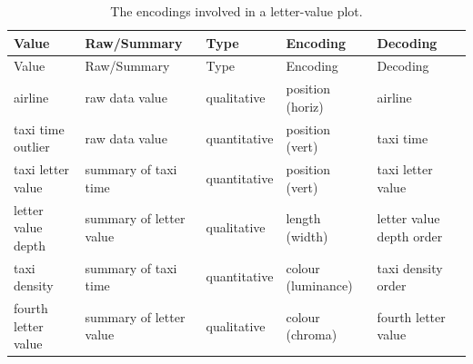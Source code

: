 \documentclass[
  letterpaper,
  DIV=11,
  numbers=noendperiod]{scrreprt}
\begin{document}
\begin{longtable}[]{@{}
  >{\raggedright\arraybackslash}p{}
  >{\raggedright\arraybackslash}p{}
  >{\raggedright\arraybackslash}p{}
  >{\raggedright\arraybackslash}p{}
  >{\raggedright\arraybackslash}p{}@{}}
\caption{The encodings involved in a letter-value
plot.}\label{tbl-lv-encodings}\tabularnewline
\toprule\noalign{}
\begin{minipage}[b]{\linewidth}\raggedright
Value
\end{minipage} & \begin{minipage}[b]{\linewidth}\raggedright
Raw/Summary
\end{minipage} & \begin{minipage}[b]{\linewidth}\raggedright
Type
\end{minipage} & \begin{minipage}[b]{\linewidth}\raggedright
Encoding
\end{minipage} & \begin{minipage}[b]{\linewidth}\raggedright
Decoding
\end{minipage} \\
\midrule\noalign{}
\endfirsthead
\toprule\noalign{}
\begin{minipage}[b]{\linewidth}\raggedright
Value
\end{minipage} & \begin{minipage}[b]{\linewidth}\raggedright
Raw/Summary
\end{minipage} & \begin{minipage}[b]{\linewidth}\raggedright
Type
\end{minipage} & \begin{minipage}[b]{\linewidth}\raggedright
Encoding
\end{minipage} & \begin{minipage}[b]{\linewidth}\raggedright
Decoding
\end{minipage} \\
\midrule\noalign{}
\endhead
\bottomrule\noalign{}
\endlastfoot
airline & raw data value & qualitative & position (horiz) & airline \\
taxi time outlier & raw data value & quantitative & position (vert) &
taxi time \\
taxi letter value & summary of taxi time & quantitative & position
(vert) & taxi letter value \\
letter value depth & summary of letter value & qualitative & length
(width) & letter value depth order \\
taxi density & summary of taxi time & quantitative & colour (luminance)
& taxi density order \\
fourth letter value & summary of letter value & qualitative & colour
(chroma) & fourth letter value \\
\end{longtable}
\end{document}
